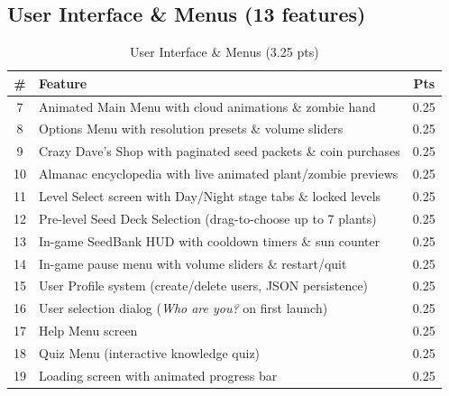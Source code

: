 \documentclass[12pt,a4paper]{article}
\begin{document}
\subsection{User Interface \& Menus (13 features)}
\begin{table}[htbp]
\centering
\footnotesize
\begin{tabular}{clc}
\toprule
\textbf{\#} & \textbf{Feature} & \textbf{Pts} \\
\midrule
7  & Animated Main Menu with cloud animations \& zombie hand & 0.25 \\
8  & Options Menu with resolution presets \& volume sliders & 0.25 \\
9  & Crazy Dave's Shop with paginated seed packets \& coin purchases & 0.25 \\
10 & Almanac encyclopedia with live animated plant/zombie previews & 0.25 \\
11 & Level Select screen with Day/Night stage tabs \& locked levels & 0.25 \\
12 & Pre-level Seed Deck Selection (drag-to-choose up to 7 plants) & 0.25 \\
13 & In-game SeedBank HUD with cooldown timers \& sun counter & 0.25 \\
14 & In-game pause menu with volume sliders \& restart/quit & 0.25 \\
15 & User Profile system (create/delete users, JSON persistence) & 0.25 \\
16 & User selection dialog (\emph{Who are you?} on first launch) & 0.25 \\
17 & Help Menu screen & 0.25 \\
18 & Quiz Menu (interactive knowledge quiz) & 0.25 \\
19 & Loading screen with animated progress bar & 0.25 \\
\bottomrule
\end{tabular}
\caption{User Interface \& Menus (3.25 pts)}
\end{table}
\end{document}
